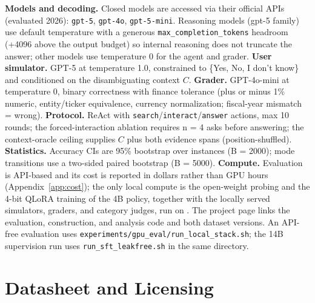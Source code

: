 \textbf{Models and decoding.} Closed models are accessed via their official APIs
(evaluated 2026): \texttt{gpt-5}, \texttt{gpt-4o}, \texttt{gpt-5-mini}. Reasoning
models (gpt-5 family) use default temperature with a generous
\texttt{max\_completion\_tokens} headroom (+4096 above the output budget) so
internal reasoning does not truncate the answer; other models use temperature
0 for the agent and grader. \textbf{User simulator.} GPT-5 at temperature 1.0,
constrained to \{Yes, No, I don't know\} and conditioned on the disambiguating
context $C$. \textbf{Grader.} GPT-4o-mini at temperature 0, binary correctness
with finance tolerance (plus or minus 1\% numeric, entity/ticker equivalence, currency
normalization; fiscal-year mismatch = wrong). \textbf{Protocol.} ReAct with
\texttt{search}/\texttt{interact}/\texttt{answer} actions, max 10 rounds; the
forced-interaction ablation requires n = 4 asks before answering; the
context-oracle ceiling supplies $C$ plus both evidence spans (position-shuffled).
\textbf{Statistics.} Accuracy CIs are 95\% bootstrap over instances (B = 2000);
mode transitions use a two-sided paired bootstrap (B = 5000).
\textbf{Compute.} Evaluation is API-based and its cost is reported in dollars rather than
GPU hours (Appendix~\ref{app:cost}); the only local compute is the open-weight probing and
the 4-bit QLoRA training of the 4B policy, together with the locally served simulators,
graders, and category judges, run on \GPUSPEC. The project page links the evaluation, construction, and analysis code and both dataset versions. An API-free evaluation uses \texttt{experiments/gpu\_eval/run\_local\_stack.sh}; the 14B supervision run uses \texttt{run\_sft\_leakfree.sh} in the same directory.

\section{Datasheet and Licensing}
\label{app:datasheet}

